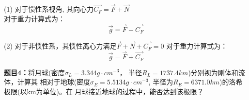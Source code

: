 \documentclass[12pt,a4paper]{article}
\begin{document}
\noindent
(1) 对于惯性系视角, 其向心力$\vec{C_F}= \vec{F} + \vec{N}$ \\
对于重力计算式为：
\begin{equation}
    \vec{g} = \vec{F} - \vec{C_F}
\end{equation}

\noindent
(2) 对于非惯性系，其惯性离心力满足$\vec{F} + \vec{N} + \vec{C_F} = 0$
对于重力计算式为：
\begin{equation}
    \vec{g} = \vec{F} + \vec{C_F}
\end{equation}

\vspace{10pt}
\noindent
{\bf 题目4：}将月球(密度$\sigma_L = 3.344 g \cdot cm^{-3}$， 半径$R_L = 1737.4km$)分别视为刚体和流体，计算其
相对于地球(密度$\sigma_E = 5.5134 g \cdot cm^{-3}$, 半径为$R_E = 6371.0 km$)的洛希极限(以km为单位)。在
月球接近地球的过程中，能否达到该极限？
\end{document}
